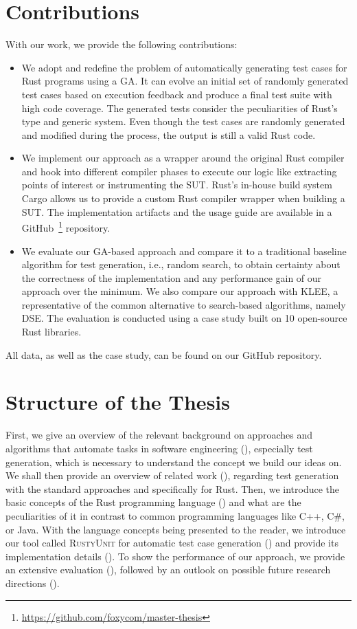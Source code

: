 \documentclass[paper=a4,%
  twoside,%
  BCOR4mm,%
  abstract=true,%
  toc=bibliography,%
  chapterprefix=true,%
  toc=bibliographynumbered,%
  open=right,%
  english,%
  pagesize=pdftex]{scrreprt}
\newcommand{\benchnum}{10\xspace}
\newcommand{\tech}{\textsc{RustyUnit}\xspace}
\newcommand{\sut}{\ac{SUT}\xspace}
\begin{document}
\section{Contributions}
With our work, we provide the following contributions:
\begin{itemize}
  \item We adopt and redefine the problem of automatically generating test cases for Rust programs using a \ac{GA}. It can evolve an initial set of randomly generated test cases based on execution feedback and produce a final test suite with high code coverage. The generated tests consider the peculiarities of Rust's type and generic system. Even though the test cases are randomly generated and modified during the process, the output is still a valid Rust code.
  \item We implement our approach as a wrapper around the original Rust compiler and hook into different compiler phases to execute our logic like extracting points of interest or instrumenting the \sut. Rust's in-house build system Cargo allows us to provide a custom Rust compiler wrapper when building a \sut. The implementation artifacts and the usage guide are available in a GitHub~\footnote{\url{https://github.com/foxycom/master-thesis}} repository.
  \item We evaluate our \ac{GA}-based approach and compare it to a traditional baseline algorithm for test generation, i.e., random search, to obtain certainty about the correctness of the implementation and any performance gain of our approach over the minimum. We also compare our approach with KLEE, a representative of the common alternative to search-based algorithms, namely \ac{DSE}. The evaluation is conducted using a case study built on \benchnum open-source Rust libraries.
\end{itemize}
All data, as well as the case study, can be found on our GitHub repository.

\section{Structure of the Thesis}
First, we give an overview of the relevant background on approaches and algorithms that automate tasks in software engineering (), especially test generation, which is necessary to understand the concept we build our ideas on. We shall then provide an overview of related work (), regarding test generation with the standard approaches and specifically for Rust. Then, we introduce the basic concepts of the Rust programming language () and what are the peculiarities of it in contrast to common programming languages like C++, C\#, or Java. With the language concepts being presented to the reader, we introduce our tool called \tech for automatic test case generation () and provide its implementation details (). To show the performance of our approach, we provide an extensive evaluation (), followed by an outlook on possible future research directions ().
\end{document}
